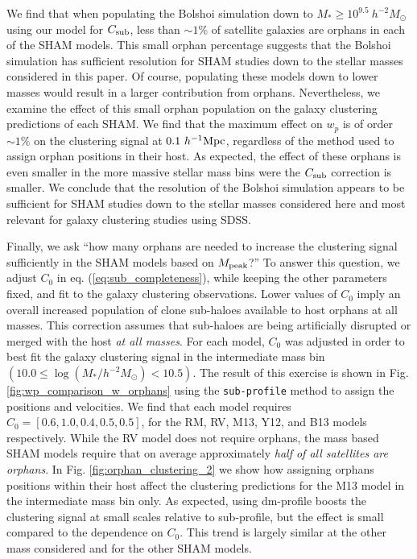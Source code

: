 \documentclass[a4paper,fleqn,usenatbib]{mnras}
\begin{document}
We find that when populating the Bolshoi simulation down to $M_* \geq 10^{9.5}~h^{-2}M_{\odot}$ using our model for $C_{\rm sub}$, less than $\sim 1\%$ of satellite galaxies are orphans in each of the SHAM models.  This small orphan percentage suggests that the Bolshoi simulation has sufficient resolution for SHAM studies down to the stellar masses considered in this paper.  Of course, populating these models down to lower masses would result in a larger contribution from orphans.  Nevertheless, we examine the effect of this small orphan population on the galaxy clustering predictions of each SHAM.  We find that the maximum effect on $w_p$ is of order $\sim 1\%$ on the clustering signal at $0.1~h^{-1}{\rm Mpc}$, regardless of the method used to assign orphan positions in their host.  As expected, the effect of these orphans is even smaller in the more massive stellar mass bins were the $C_{\rm sub}$ correction is smaller.  We conclude that the resolution of the Bolshoi simulation appears to be sufficient for SHAM studies down to the stellar masses considered here and most relevant for galaxy clustering studies using SDSS.    

Finally, we ask ``how many orphans are needed to increase the clustering signal sufficiently in the SHAM models based on $M_{\rm peak}$?''  To answer this question, we adjust $C_0$ in eq. (\ref{eq:sub_completeness}), while keeping the other parameters fixed, and fit to the galaxy clustering observations.  Lower values of $C_0$ imply an overall increased population of clone sub-haloes available to host orphans at all masses.  This correction assumes that sub-haloes are being artificially disrupted or merged with the host {\em at all masses}.  For each model, $C_0$ was adjusted in order to best fit the galaxy clustering signal in the intermediate mass bin $(10.0 \leq \log(M_*/h^{-2}M_{\odot}) <10.5)$.  The result of this exercise is shown in Fig. \ref{fig:wp_comparison_w_orphans} using the {\tt sub-profile} method to assign the positions and velocities.  We find that each model requires $C_{0} = [0.6,1.0, 0.4, 0.5, 0.5]$, for the RM, RV, M13, Y12, and B13 models respectively.  While the RV model does not require orphans, the mass based SHAM models require that on average approximately {\em half of all satellites are orphans}.  In Fig. \ref{fig:orphan_clustering_2} we show how assigning orphans positions within their host affect the clustering predictions for the M13 model in the intermediate mass bin only.  As expected, using {\rm dm-profile} boosts the clustering signal at small scales relative to {\rm sub-profile}, but the effect is small compared to the dependence on $C_{0}$.  This trend is largely similar at the other mass considered and for the other SHAM models.
\end{document}
